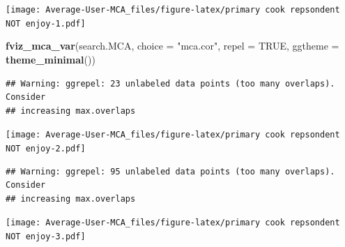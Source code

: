 \documentclass[
]{article}
\newenvironment{Shaded}{\begin{snugshade}}{\end{snugshade}}
\newcommand{\DataTypeTok}[1]{\textcolor[rgb]{0.13,0.29,0.53}{#1}}
\newcommand{\KeywordTok}[1]{\textcolor[rgb]{0.13,0.29,0.53}{\textbf{#1}}}
\newcommand{\NormalTok}[1]{#1}
\newcommand{\OtherTok}[1]{\textcolor[rgb]{0.56,0.35,0.01}{#1}}
\newcommand{\StringTok}[1]{\textcolor[rgb]{0.31,0.60,0.02}{#1}}
\begin{document}
\texttt{[image: Average-User-MCA\_files/figure-latex/primary cook repsondent NOT enjoy-1.pdf]}

\begin{Shaded}
\begin{Highlighting}[]
\KeywordTok{fviz_mca_var}\NormalTok{(search.MCA, }\DataTypeTok{choice =} \StringTok{"mca.cor"}\NormalTok{, }\DataTypeTok{repel =} \OtherTok{TRUE}\NormalTok{,}
             \DataTypeTok{ggtheme =} \KeywordTok{theme_minimal}\NormalTok{())}
\end{Highlighting}
\end{Shaded}

\begin{verbatim}
## Warning: ggrepel: 23 unlabeled data points (too many overlaps). Consider
## increasing max.overlaps
\end{verbatim}

\texttt{[image: Average-User-MCA\_files/figure-latex/primary cook repsondent NOT enjoy-2.pdf]}

\begin{Shaded}
\end{Shaded}

\begin{verbatim}
## Warning: ggrepel: 95 unlabeled data points (too many overlaps). Consider
## increasing max.overlaps
\end{verbatim}

\texttt{[image: Average-User-MCA\_files/figure-latex/primary cook repsondent NOT enjoy-3.pdf]}
\end{document}
